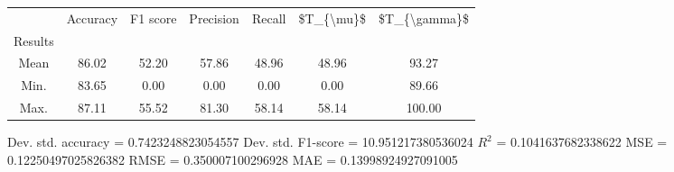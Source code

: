 \begin{tabular}{|c|c|c|c|c|c|c|}
\toprule
{} &  Accuracy &  F1 score &  Precision &  Recall &  \$T\_\{\textbackslash mu\}\$ &  \$T\_\{\textbackslash gamma\}\$ \\
Results &           &           &            &         &            &               \\
\hline
Mean    &     86.02 &     52.20 &      57.86 &   48.96 &      48.96 &         93.27 \\
Min.    &     83.65 &      0.00 &       0.00 &    0.00 &       0.00 &         89.66 \\
Max.    &     87.11 &     55.52 &      81.30 &   58.14 &      58.14 &        100.00 \\
\bottomrule
\end{tabular}

 Dev. std. accuracy = 0.7423248823054557
 Dev. std. F1-score = 10.951217380536024
 $R^2$ = 0.1041637682338622
 MSE = 0.12250497025826382
 RMSE = 0.350007100296928
 MAE = 0.13998924927091005